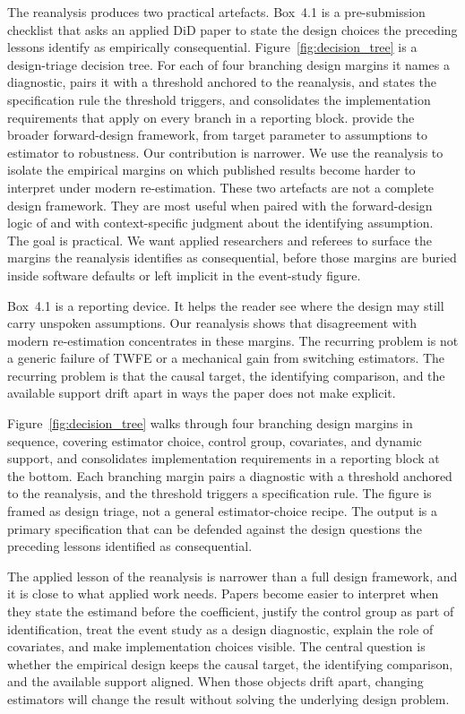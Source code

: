 The reanalysis produces two practical artefacts. Box~4.1 is a pre-submission checklist that asks an applied DiD paper to state the design choices the preceding lessons identify as empirically consequential. Figure~\ref{fig:decision_tree} is a design-triage decision tree. For each of four branching design margins it names a diagnostic, pairs it with a threshold anchored to the reanalysis, and states the specification rule the threshold triggers, and consolidates the implementation requirements that apply on every branch in a reporting block. \textcite{baker2025difference} provide the broader forward-design framework, from target parameter to assumptions to estimator to robustness. Our contribution is narrower. We use the reanalysis to isolate the empirical margins on which published results become harder to interpret under modern re-estimation. These two artefacts are not a complete design framework. They are most useful when paired with the forward-design logic of \textcite{baker2025difference} and with context-specific judgment about the identifying assumption. The goal is practical. We want applied researchers and referees to surface the margins the reanalysis identifies as consequential, before those margins are buried inside software defaults or left implicit in the event-study figure.

Box~4.1 is a reporting device. It helps the reader see where the design may still carry unspoken assumptions. Our reanalysis shows that disagreement with modern re-estimation concentrates in these margins. The recurring problem is not a generic failure of TWFE or a mechanical gain from switching estimators. The recurring problem is that the causal target, the identifying comparison, and the available support drift apart in ways the paper does not make explicit.

Figure~\ref{fig:decision_tree} walks through four branching design margins in sequence, covering estimator choice, control group, covariates, and dynamic support, and consolidates implementation requirements in a reporting block at the bottom. Each branching margin pairs a diagnostic with a threshold anchored to the reanalysis, and the threshold triggers a specification rule. The figure is framed as design triage, not a general estimator-choice recipe. The output is a primary specification that can be defended against the design questions the preceding lessons identified as consequential.

The applied lesson of the reanalysis is narrower than a full design framework, and it is close to what applied work needs. Papers become easier to interpret when they state the estimand before the coefficient, justify the control group as part of identification, treat the event study as a design diagnostic, explain the role of covariates, and make implementation choices visible. The central question is whether the empirical design keeps the causal target, the identifying comparison, and the available support aligned. When those objects drift apart, changing estimators will change the result without solving the underlying design problem.

